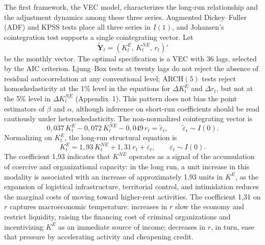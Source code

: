 \documentclass[ecta,nameyear,draft]{econsocart}
\theoremstyle{plain}
\theoremstyle{definition}
\newcommand{\1}{\mathbf{1}}
\begin{document}
The first framework, the VEC model, characterizes the long-run relationship and the adjustment dynamics among these three series. Augmented Dickey--Fuller (ADF) and KPSS tests place all three series in $I(1)$, and Johansen's cointegration test supports a single cointegrating vector. Let
\[
\tilde{\mathbf{Y}}_t = (K^E_t,\, K^{NE}_t,\, r_t)'
\]
be the monthly vector. The optimal specification is a VEC with 36 lags, selected by the AIC criterion. Ljung--Box tests at twenty lags do not reject the absence of residual autocorrelation at any conventional level; ARCH$(5)$ tests reject homoskedasticity at the 1\% level in the equations for $\Delta K^E_t$ and $\Delta r_t$, but not at the 5\% level in $\Delta K^{NE}_t$ (Appendix~1). This pattern does not bias the point estimators of $\beta$ and $\alpha$, although inference on short-run coefficients should be read cautiously under heteroskedasticity. The non-normalized cointegrating vector is
\begin{equation}
0{,}037\,K^{E}_t - 0{,}072\,K^{NE}_t - 0{,}049\,r_t = \tilde{\varepsilon}_t,
\qquad \tilde{\varepsilon}_t \sim I(0).
\label{eq:vec-coint}
\end{equation}
Normalizing on $K^E_t$, the long-run structural equation is
\begin{equation}
K^E_t = 1{,}93\,K^{NE}_t + 1{,}31\,r_t + \varepsilon_t,
\qquad \varepsilon_t \sim I(0).
\label{eq:vec-longrun}
\end{equation}
The coefficient 1{,}93 indicates that $K^{NE}$ operates as a signal of the accumulation of coercive and organizational capacity: in the long run, a unit increase in this modality is associated with an increase of approximately 1{,}93 units in $K^E$, as the expansion of logistical infrastructure, territorial control, and intimidation reduces the marginal costs of moving toward higher-rent activities. The coefficient 1{,}31 on $r$ captures macroeconomic temperature: increases in $r$ slow the economy and restrict liquidity, raising the financing cost of criminal organizations and incentivizing $K^E$ as an immediate source of income; decreases in $r$, in turn, ease that pressure by accelerating activity and cheapening credit.
\end{document}

